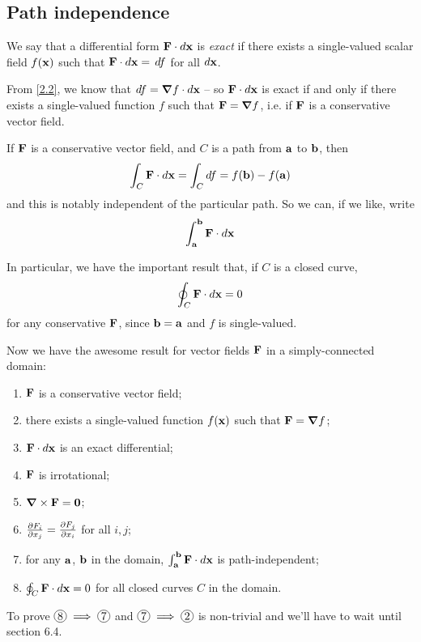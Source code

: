 \documentclass{../template/note}
\begin{document}
    \subsection{Path independence}

    \begin{definition*}
        We say that a differential form \(\V F \cdot d \V x\) is \emph{exact} if there exists a single-valued scalar field \(f(\V x)\) such that \(\V F \cdot d \V x = \D f\) for all \(d \V x\).
    \end{definition*}
    
    From \cref{2.2}, we know that \(df = \grad f \cdot d \V x\) -- so \(\V F \cdot d \V x\) is exact if and only if there exists a single-valued function \(f\) such that \(\V F = \grad f\), i.e. if \(\V F\) is a conservative vector field.

    If \(\V F\) is a conservative vector field, and \(C\) is a path from \(\V a\) to \(\V b\), then
    \begin{align*}
        \int_C \V F \cdot d \V x = \int_C df = f(\V b) - f(\V a)
    \end{align*}
    and this is notably independent of the particular path. So we can, if we like, write
    \begin{align*}
        \int_{\V a}^{\V b} \V F \cdot d \V x
    \end{align*}
    
    In particular, we have the important result that, if \(C\) is a closed curve,
    \begin{align*}
        \oint_C \V F \cdot d \V x = 0
    \end{align*}
    for any conservative \(\V F\), since \(\V b = \V a\) and \(f\) is single-valued.

    Now we have the awesome result for vector fields \(\V F\) in a simply-connected domain:

    \begin{enumerate}[label=\protect\circled{\arabic*}]
        \item \(\V F\) is a conservative vector field;
        \item there exists a single-valued function \(f(\V x)\) such that \(\V F = \grad f\);
        \item \(\V F \cdot d \V x\) is an exact differential;
        \item \(\V F\) is irrotational;
        \item \(\grad \times \V F = \V 0\);
        \item \(\pd{F_i}{x_j} = \pd{F_j}{x_i}\) for all \(i, j\);
        \item for any \(\V a\), \(\V b\) in the domain, \(\int_{\V a}^{\V b} \V F \cdot d \V x\) is path-independent;
        \item \(\oint_C \V F \cdot d \V x = 0\) for all closed curves \(C\) in the domain.
    \end{enumerate}
    To prove \(\circled 8 \implies \circled 7\) and \(\circled 7 \implies \circled 2\) is non-trivial and we'll have to wait until section 6.4.
\end{document}
